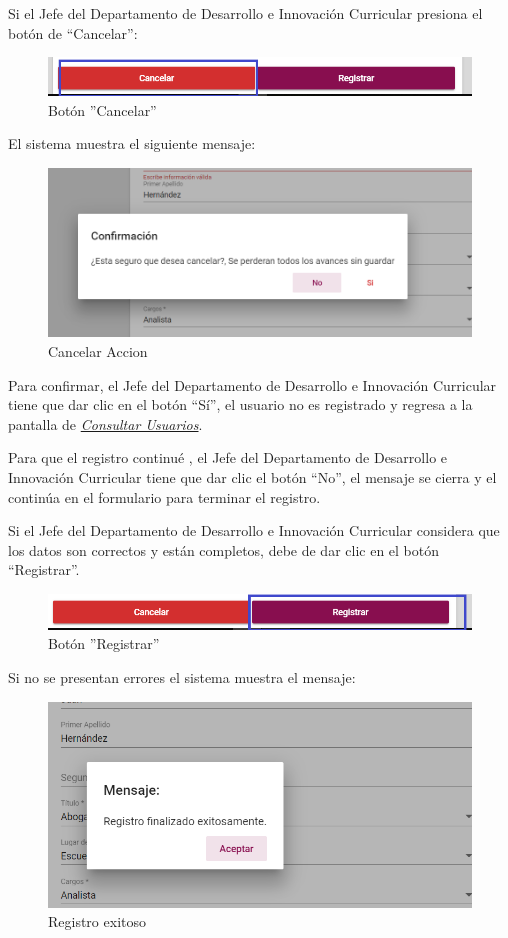 \newpage
Si el Jefe del Departamento de Desarrollo e Innovación Curricular presiona el botón de “Cancelar”:

\begin{figure}[H]
	\centering
	\hypertarget{cancel1}{\includegraphics[width=0.7\linewidth]{images/SP5/BtnCancelar1}}
	\caption{Botón ''Cancelar''}
	\label{cancel1}
\end{figure}

El sistema muestra el siguiente mensaje:


\begin{figure}[H]
	\centering
	\includegraphics[width=0.4\linewidth]{images/SP5/MSG29}
	\caption{Cancelar Accion}
	\label{mensaje29}
\end{figure}

Para confirmar, el Jefe del Departamento de Desarrollo e Innovación Curricular tiene que dar clic en el botón “Sí”, el usuario no es registrado y regresa a la pantalla de \hyperlink{consultarUs}{\textit{Consultar Usuarios}}.

Para que el registro continué , el Jefe del Departamento de Desarrollo e Innovación Curricular tiene que  dar clic el botón “No”, el mensaje se  cierra  y el continúa en el formulario para terminar el registro.

Si el Jefe del Departamento de Desarrollo e Innovación Curricular considera que los datos son correctos y están completos, debe de dar clic en el botón “Registrar”.

\begin{figure}[H]
	\centering
	\hypertarget{btnreg}{\includegraphics[width=0.7\linewidth]{images/SP5/BtnRegistrar}}
	\caption{Botón ''Registrar''}
	\label{btnreg}
\end{figure}

Si no se presentan errores el sistema muestra el mensaje:


\begin{figure}[H]
	\centering
	\includegraphics[width=0.4\linewidth]{images/SP5/MSG5}
	\caption{Registro exitoso}
	\label{mensaje5}
	
\end{figure}

